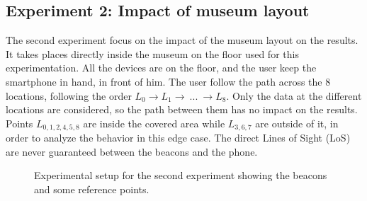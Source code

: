 \subsection{Experiment 2: Impact of museum layout}
\label{exp:2_museum}

The second experiment focus on the impact of the museum layout on the results. It takes places directly inside the museum on the floor used for this experimentation. All the devices are on the floor, and the user keep the smartphone in hand, in front of him. The user follow the path across the 8 locations, following the order $L_0 \rightarrow L_1 \rightarrow~...~\rightarrow L_8$. Only the data at the different locations are considered, so the path between them has no impact on the results. Points $L_{0,1,2,4,5,8}$ are inside the covered area while $L_{3,6,7}$ are outside of it, in order to analyze the behavior in this edge case. The direct Lines of Sight (LoS) are never guaranteed between the beacons and the phone.

\begin{figure}[H]
    \centering
    \caption{Experimental setup for the second experiment showing the beacons and some reference points.}
    \label{fig:exp2_museum}
\end{figure}

